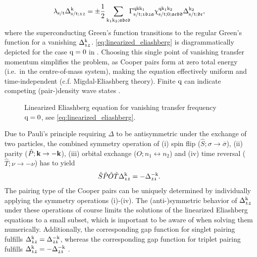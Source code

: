 \documentclass[../../main.tex]{subfiles}
\begin{document}
\begin{align}\label{eq:linearized_eliashberg}
	\lambda_{\text{s}/\text{t}}\Delta_{\text{s}/\text{t};\mathfrak{12}}^{\text{k}}=\pm\frac{1}{2}\sum_{\text{k}_1\text{k}_2;\mathfrak{abcd}}\!\!\Gamma^{\text{q}\text{k}\text{k}_1}_{\text{s}/\text{t};\mathfrak{1b2a}}\chi^{\text{q}\text{k}_1\text{k}_2}_{\text{s}/\text{t};0;\mathfrak{acbd}}\Delta_{\text{s}/\text{t};\mathfrak{dc}}^{\text{k}_2},
\end{align}
where the superconducting Green's function transitions to the regular Green's function for a vanishing $\Delta_{\mathfrak{12}}^{\text{k}}$. \eqref{eq:linearized_eliashberg} is diagrammatically depicted for the case $\text{q}=0$ in . Choosing this single point of vanishing transfer momentum simplifies the problem, as Cooper pairs form at zero total energy (i.e.\ in the centre-of-mass system), making the equation effectively uniform and time-independent (c.f. Migdal-Eliashberg theory). Finite $\text{q}$ can indicate competing (pair-)density wave states \cite{Yoshida2021}.
\begin{figure}[ht!]
	\centering
  	
  	\caption{Linearized Eliashberg equation for vanishing transfer frequency $\text{q}=0$, see \eqref{eq:linearized_eliashberg}.}
  	\label{fig:linearized_eliashberg}
\end{figure}

Due to Pauli's principle requiring $\Delta$ to be antisymmetric under the exchange of two particles, the combined symmetry operation of (i) spin flip ($\hat S; \sigma\to\overline{\sigma}$), (ii) parity ($\hat P; \textbf{k}\to-\textbf{k}$), (iii) orbital exchange ($\hat O; n_1 \leftrightarrow n_2$) and (iv) time reversal ($\hat T; \nu\to-\nu$) has to yield \cite{Riseborough2004}
\begin{align}
	\hat S\hat P\hat O\hat T \Delta_{\mathfrak{12}}^{\text{k}} = -\Delta_{\mathfrak{21}}^{-\text{k}}.
\end{align}
The pairing type of the Cooper pairs can be uniquely determined by individually applying the symmetry operations (i)-(iv). The (anti-)symmetric behavior of $\Delta_{\mathfrak{12}}^{\text{k}}$ under these operations of course limits the solutions of the linearized Eliashberg equations to a small subset, which is important to be aware of when solving them numerically. Additionally, the corresponding gap function for singlet pairing fulfills $\Delta^{\text{k}}_{\mathfrak{12}}=\Delta^{-\text{k}}_{\mathfrak{21}}$, whereas the corresponding gap function for triplet pairing fulfills $\Delta^{\text{k}}_{\mathfrak{12}}=-\Delta_{\mathfrak{21}}^{-\text{k}}$ \cite{Nourafkan2016}.
\end{document}
